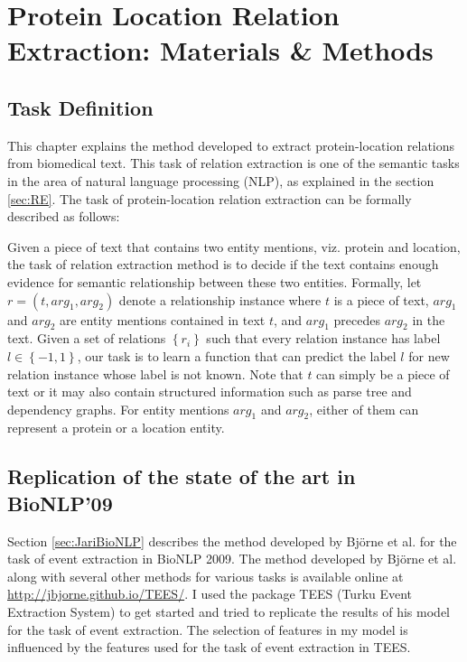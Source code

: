 \chapter{Protein Location Relation Extraction: Materials \& Methods}\label{chapter:methods}
\newcommand*{\xml}[1]{\texttt{<#1>}}
\section{Task Definition}

This chapter explains the method developed to extract protein-location relations from biomedical text. This task of relation extraction is one of the semantic tasks in the area of natural language processing (NLP), as explained in the section \ref{sec:RE}. The task of protein-location relation extraction can be formally described as follows:

Given a piece of text that contains two entity mentions, viz. protein and location, the task of relation extraction method is to decide if the text contains enough evidence for semantic relationship between these two entities. Formally, let $r=(t,arg_1,arg_2)$ denote a relationship instance where $t$ is a piece of text, $arg_1$ and $arg_2$  are entity mentions contained in text $t$, and $arg_1$ precedes $arg_2$ in the text. Given a set of relations $\left\lbrace r_i \right\rbrace$ such that every relation instance has label $l \in \left\lbrace-1,1\right\rbrace$, our task is to learn a function that can predict the label $l$ for new relation instance whose label is not known. Note that $t$ can simply be a piece of text or it may also contain structured information such as parse tree and dependency graphs. For entity mentions $arg_1$ and $arg_2$, either of them can represent a protein or a location entity.
 
\section{Replication of the state of the art in BioNLP'09}

Section \ref{sec:JariBioNLP} describes the method developed by Björne et al. for the task of event extraction in BioNLP 2009. The method developed by Björne et al. along with several other methods for various tasks is available online at \url{http://jbjorne.github.io/TEES/}. I used the package TEES (Turku Event Extraction System) to get started and tried to replicate the results of his model for the task of event extraction. The selection of features in my model is influenced by the features used for the task of event extraction in TEES.

